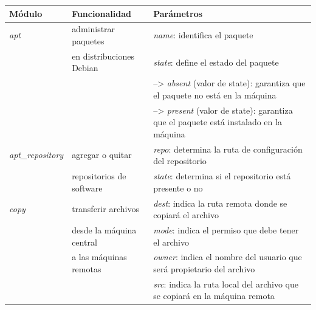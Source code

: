 \documentclass[a4paper,12pt]{article}
\begin{document}
{\fontsize{10}{10}\selectfont

\begin{center}
\begin{tabulary}{\textwidth}{l|l|L}
\hline
Módulo & Funcionalidad & Parámetros\\
\hline
\emph{apt} & administrar paquetes & \emph{name}: identifica el paquete\\
 & en distribuciones Debian & \emph{state}: define el estado del paquete\\
 &  & --> \emph{absent} (valor de state): garantiza que el paquete no está en la máquina\\
 &  & --> \emph{present} (valor de state): garantiza que el paquete está instalado en la máquina\\
\hline
\emph{apt\_repository} & agregar o quitar & \emph{repo}: determina la ruta de configuración del repositorio\\
 & repositorios de software & \emph{state}: determina si el repositorio está presente o no\\
\hline
\emph{copy} & transferir archivos & \emph{dest}: indica la ruta remota donde se copiará el archivo\\
 & desde la máquina central & \emph{mode}: indica el permiso que debe tener el archivo\\
 & a las máquinas remotas & \emph{owner}: indica el nombre del usuario que será propietario del archivo\\
 &  & \emph{src}: indica la ruta local del archivo que se copiará en la máquina remota\\
\hline
\end{tabulary}
\end{center}

}
\end{document}
